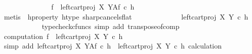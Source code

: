 \begin{isabellebody}
\ \ \ \ \isanewline
\ \ \ \ \ \ \ \ \isamarkupfalse%
\ {\isachardoublequoteopen}f\ {\isacharequal}{\kern0pt}\ {\isacharparenleft}{\kern0pt}left{\isacharunderscore}{\kern0pt}cart{\isacharunderscore}{\kern0pt}proj\ X\ Y{\isacharparenright}{\kern0pt}\isactrlbsup A\isactrlesup \isactrlsub f\ {\isasymcirc}\isactrlsub c\ h\isactrlsup {\isasymflat}\isactrlsup {\isasymsharp}{\isachardoublequoteclose}\isanewline
\ \ \ \ \ \ \ \ \ \ \isamarkupfalse%
\ {\isacharparenleft}{\kern0pt}metis\ \ h{\isacharunderscore}{\kern0pt}property{}\ h{\isacharunderscore}{\kern0pt}type\ sharp{\isacharunderscore}{\kern0pt}cancels{\isacharunderscore}{\kern0pt}flat{\isacharparenright}{\kern0pt}\isanewline
\ \ \ \ \ \ \ \ \isamarkupfalse%
\ \isamarkupfalse%
\ {\isachardoublequoteopen}{\isachardot}{\kern0pt}{\isachardot}{\kern0pt}{\isachardot}{\kern0pt}\ {\isacharequal}{\kern0pt}\ {\isacharparenleft}{\kern0pt}{\isacharparenleft}{\kern0pt}left{\isacharunderscore}{\kern0pt}cart{\isacharunderscore}{\kern0pt}proj\ X\ Y{\isacharparenright}{\kern0pt}\ {\isasymcirc}\isactrlsub c\ h\isactrlsup {\isasymflat}{\isacharparenright}{\kern0pt}\isactrlsup {\isasymsharp}{\isachardoublequoteclose}\isanewline
\ \ \ \ \ \ \ \ \ \ \isamarkupfalse%
\ {\isacharparenleft}{\kern0pt}typecheck{\isacharunderscore}{\kern0pt}cfuncs{\isacharcomma}{\kern0pt}\ simp\ add{\isacharcolon}{\kern0pt}\ transpose{\isacharunderscore}{\kern0pt}of{\isacharunderscore}{\kern0pt}comp{\isacharparenright}{\kern0pt}\isanewline
\ \ \ \ \ \ \ \ \isamarkupfalse%
\ computation{}{\isacharcolon}{\kern0pt}\ {\isachardoublequoteopen}f\ {\isacharequal}{\kern0pt}\ {\isacharparenleft}{\kern0pt}{\isacharparenleft}{\kern0pt}left{\isacharunderscore}{\kern0pt}cart{\isacharunderscore}{\kern0pt}proj\ X\ Y{\isacharparenright}{\kern0pt}\ {\isasymcirc}\isactrlsub c\ h\isactrlsup {\isasymflat}{\isacharparenright}{\kern0pt}\isactrlsup {\isasymsharp}{\isachardoublequoteclose}\isanewline
\ \ \ \ \ \ \ \ \ \ \isamarkupfalse%
\ {\isacharparenleft}{\kern0pt}simp\ add{\isacharcolon}{\kern0pt}\ {\isacartoucheopen}left{\isacharunderscore}{\kern0pt}cart{\isacharunderscore}{\kern0pt}proj\ X\ Y\isactrlbsup A\isactrlesup \isactrlsub f\ {\isasymcirc}\isactrlsub c\ h\isactrlsup {\isasymflat}\isactrlsup {\isasymsharp}\ {\isacharequal}{\kern0pt}\ {\isacharparenleft}{\kern0pt}left{\isacharunderscore}{\kern0pt}cart{\isacharunderscore}{\kern0pt}proj\ X\ Y\ {\isasymcirc}\isactrlsub c\ h\isactrlsup {\isasymflat}{\isacharparenright}{\kern0pt}\isactrlsup {\isasymsharp}{\isacartoucheclose}\ calculation{\isacharparenright}{\kern0pt}\isanewline

\end{isabellebody}
